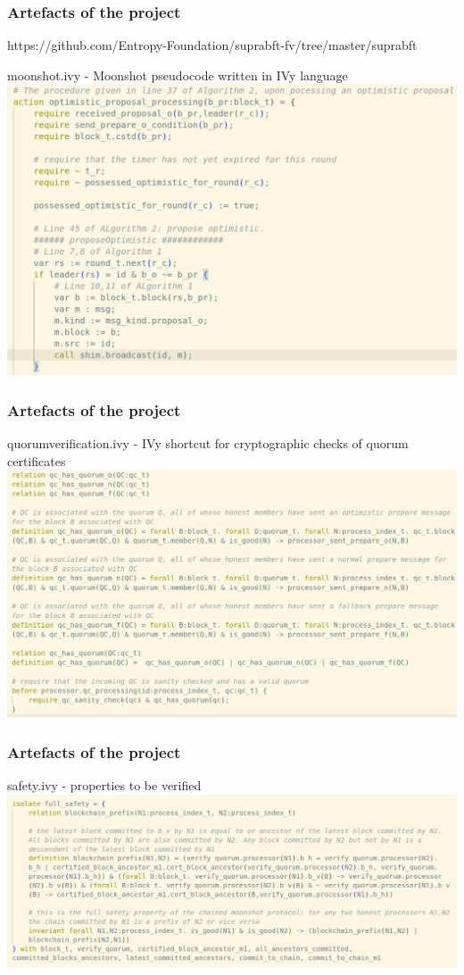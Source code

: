 \documentclass{beamer}
\begin{document}
\begin{frame}
    \frametitle{Artefacts of the project}
     https://github.com/Entropy-Foundation/suprabft-fv/tree/master/suprabft    

     \alert{moonshot.ivy} - Moonshot pseudocode written in IVy
     language\\
     \includegraphics[scale=0.25]{OptimisticPropProc.png}
\end{frame}

\begin{frame}
    \frametitle{Artefacts of the project}
    \alert{quorum\textunderscore{}verification.ivy} - IVy shortcut
    for cryptographic checks of quorum certificates
    \includegraphics[scale=0.25]{QuorumDef.png}
\end{frame}

\begin{frame}
    \frametitle{Artefacts of the project}
    \alert{safety.ivy} - properties to be verified
    \includegraphics[scale=0.25]{FullSafety.png}
\end{frame}
\end{document}
